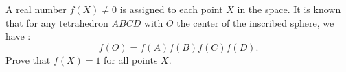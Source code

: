 A real number $f(X)\neq 0$ is assigned to each point $X$ in the space.
It is known that for any tetrahedron $ABCD$ with $O$ the center of the inscribed sphere, we have :
\[ f(O)=f(A)f(B)f(C)f(D). \]
Prove that $f(X)=1$ for all points $X$.

